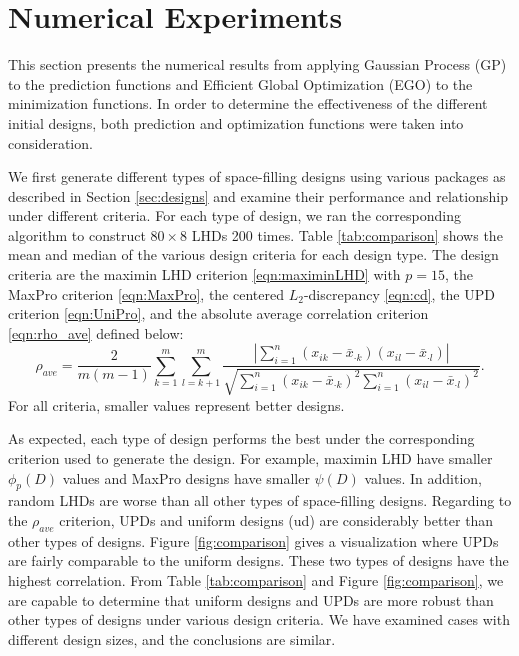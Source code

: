 \documentclass [PhD] {package/uclathes}
\begin{document}
\clearpage
\section{Numerical Experiments}\label{numerical-experiments}
This section presents the numerical results from applying Gaussian Process (GP) to the prediction functions and Efficient Global Optimization (EGO) to the minimization functions. In order to determine the effectiveness of the different initial designs, both prediction and optimization functions were taken into consideration.

We first generate different types of space-filling designs using various packages as described in Section \ref{sec:designs} and examine their performance and relationship under different criteria. For each type of design, we ran the corresponding algorithm to construct $80\times 8$ LHDs 200 times. Table \ref{tab:comparison} shows the mean and median of the various design criteria for each design type.
The design criteria are the maximin LHD criterion \eqref{eqn:maximinLHD} with $p=15$, the MaxPro criterion \eqref{eqn:MaxPro}, the centered $L_2$-discrepancy \eqref{eqn:cd}, the UPD criterion \eqref{eqn:UniPro}, and the absolute average correlation criterion \eqref{eqn:rho_ave}  defined below:
\begin{equation}\label{eqn:rho_ave}
\rho_{ave} =\frac{2}{m(m-1)}\sum_{k = 1}^m\sum_{l = k+1}^m\frac{\left|\sum_{i=1}^n\left(x_{ik}-\bar{x}_{\cdot k}\right)\left(x_{il}-\bar{x}_{\cdot l}\right)\right|}{\sqrt{\sum_{i=1}^n\left(x_{ik}-\bar{x}_{\cdot k}\right)^2 \sum_{i=1}^n\left(x_{il} -\bar{x}_{\cdot l}\right)^2}}.
\end{equation}
For all criteria, smaller values represent better designs.

As expected, each type of design performs the best under the corresponding criterion used to generate the design. For example, maximin LHD have smaller $\phi_p(D)$ values and MaxPro designs have smaller $\psi(D)$ values. In addition, random LHDs are worse than all other types of space-filling designs.
Regarding to the $\rho_{ave}$ criterion, UPDs and uniform designs (ud) are considerably better than other types of designs.
 Figure \ref{fig:comparison} gives a visualization where UPDs are fairly comparable to the uniform designs. These two types of designs have the highest correlation. From Table \ref{tab:comparison} and Figure \ref{fig:comparison}, we are capable to determine that uniform designs and UPDs are more robust than other types of designs under various design criteria. We have examined cases with different design sizes, and the conclusions are similar.
\end{document}
